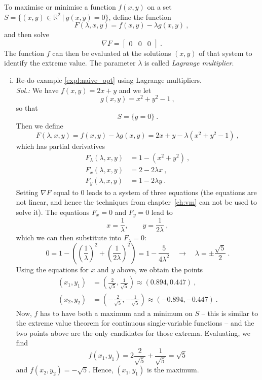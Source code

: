 \begin{theorem}
To maximise or minimise a function $f(x,y)$ on a set 
$S = \{ (x,y) \in \mathbb{R}^2 \: | \: g(x,y) = 0 \} $,
define the function
\[ F(\lambda,x,y) = f(x,y) - \lambda g(x,y) \:, \]
and then solve
\[ \nabla F = \begin{bmatrix} 0 & 0 & 0 \end{bmatrix} \:. \]
The function $f$ can then be evaluated at the solutions $(x,y)$ of that system to identify the extreme value. The parameter $\lambda$ is called \emph{Lagrange multiplier}.
\end{theorem}

\begin{example}
\label{expl:opt}
\begin{enumerate}[(i)]
	\item Re-do example \ref{expl:naive_opt} using Lagrange multipliers.\\
	{\it Sol.:} We have $f(x,y) = 2x + y$ and we let
	\[ g(x,y) = x^2 + y^2 - 1 \:, \]
	so that
	\[  S = \{ g=0 \} \:. \]
	Then we define
	\[ F(\lambda,x,y) = f(x,y) - \lambda g(x,y) = 2x+y - \lambda (x^2+y^2-1) \:, \]
	which has partial derivatives
	\begin{equation*}
	\label{eq:lagrange_system}
	\begin{split}
	F_\lambda(\lambda,x,y) & = 1-(x^2+y^2) \:, \\
	F_x(\lambda,x,y) & = 2 - 2\lambda x \:, \\
	F_y(\lambda,x,y) & = 1 - 2\lambda y \:.
	\end{split}
	\end{equation*}
	Setting $\nabla F$ equal to $0$ leads to a system of three equations (the equations are not linear, and hence the techniques from chapter~\ref{ch:vm} can not be used to solve it). The equations $F_x=0$ and $F_y=0$ lead to
	\[ x = \frac{1}{\lambda}, \qquad y = \frac{1}{2\lambda} \:, \]
	which we can then substitute into $F_\lambda=0$:
	\[ 0 = 1 - \left( \left( \frac{1}{\lambda} \right)^2 
	+ \left( \frac{1}{2\lambda} \right)^2 \right) 
	= 1 -\frac{5}{4\lambda^2} \quad \rightarrow \quad \lambda = \pm \frac{\sqrt{5}}{2} \:. \]
	Using the equations for $x$ and $y$ above, we obtain the points 
	\begin{equation*}
	\begin{split}
(x_1,y_1) &= \left( \frac{2}{\sqrt{5}},\frac{1}{\sqrt{5}} \right) \approx (0.894,0.447) \:, \\
(x_2,y_2) &= \left( -\frac{2}{\sqrt{5}},-\frac{1}{\sqrt{5}} \right) \approx (-0.894,-0.447) \:.
	\end{split}
	\end{equation*}
	Now, $f$ has to have both a maximum and a minimum on $S$ -- this is similar to the extreme value theorem for continuous single-variable functions -- and the two points above are the only candidates for those extrema. Evaluating, we find
	\[ f(x_1,y_1) = 2 \frac{2}{\sqrt{5}} + \frac{1}{\sqrt{5}} = \sqrt{5} \]
	and $f(x_2,y_2)= - \sqrt{5}$. Hence, $(x_1,y_1)$ is the maximum.
	

\end{enumerate}
\end{example}
